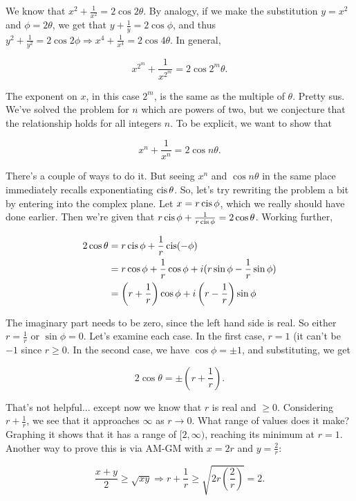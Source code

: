 \documentclass[../key.tex]{subfiles}
\begin{document}
We know that $x^2 + \frac{1}{x^2} = 2\cos 2\theta$. By analogy, if we make the substitution $y=x^2$ and $\phi = 2\theta$, we get that $y+\frac{1}{y} = 2\cos\phi$, and thus $y^2+\frac{1}{y^2} = 2\cos 2\phi \Longrightarrow x^4 + \frac{1}{x^4} = 2\cos 4\theta$. In general,

$$x^{2^m} + \frac{1}{x^{2^m}} = 2\cos 2^m\theta.$$

The exponent on $x$, in this case $2^m$, is the same as the multiple of $\theta$. Pretty sus. We've solved the problem for $n$ which are powers of two, but we conjecture that the relationship holds for all integers $n$. To be explicit, we want to show that

$$x^n + \frac{1}{x^n} = 2\cos n\theta.$$

There's a couple of ways to do it. But seeing $x^n$ and $\cos n\theta$ in the same place immediately recalls exponentiating $\operatorname{cis} \theta$. So, let's try rewriting the problem a bit by entering into the complex plane. Let $x = r\operatorname{cis}\phi$, which we really should have done earlier. Then we're given that $r\operatorname{cis}\phi + \frac{1}{r\operatorname{cis}\phi} = 2\cos \theta$. Working further,

\begin{align*}
    2\cos \theta &= r\operatorname{cis}\phi + \frac{1}{r}\operatorname{cis}(-\phi) \\
    &= r\cos\phi + \frac{1}{r}\cos\phi + i(r\sin\phi - \frac{1}{r}\sin\phi) \\
    &= \left(r+\frac{1}{r}\right)\cos\phi + i\left(r - \frac{1}{r}\right)\sin\phi \\
\end{align*}

The imaginary part needs to be zero, since the left hand side is real. So either $r=\frac{1}{r}$ or $\sin\phi = 0$. Let's examine each case. In the first case, $r=1$ (it can't be $-1$ since $r\geq 0$. In the second case, we have $\cos\phi = \pm 1$, and substituting, we get

$$2\cos \theta = \pm \left(r + \frac{1}{r} \right).$$

That's not helpful... except now we know that $r$ is real and $\geq 0$. Considering $r + \frac{1}{r}$, we see that it approaches $\infty$ as $r\to 0$. What range of values does it make? Graphing it shows that it has a range of $[2, \infty)$, reaching its minimum at $r=1$. Another way to prove this is via AM-GM with $x=2r$ and $y=\frac{2}{r}$:

$$\frac{x+y}{2} \geq \sqrt{xy} \Longrightarrow r + \frac{1}{r} \geq \sqrt{2r\left(\frac{2}{r}\right)} = 2.$$
\end{document}
